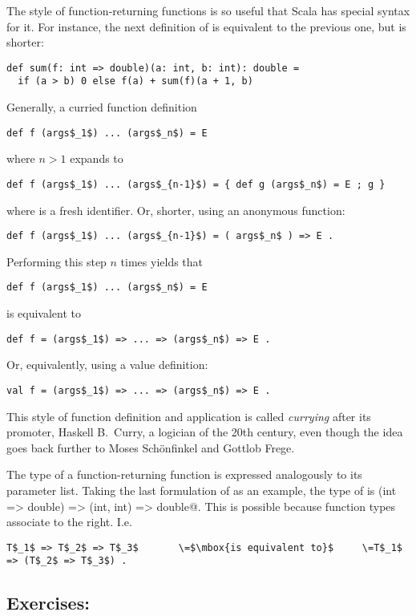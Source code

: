 \documentclass[11pt]{book}
\begin{document}
The style of function-returning functions is so useful that Scala has
special syntax for it. For instance, the next definition of \verb@sum@
is equivalent to the previous one, but is shorter:
\begin{verbatim}
def sum(f: int => double)(a: int, b: int): double =
  if (a > b) 0 else f(a) + sum(f)(a + 1, b)
\end{verbatim}
Generally, a curried function definition 
\begin{verbatim}
def f (args$_1$) ... (args$_n$) = E
\end{verbatim}
where $n > 1$ expands to
\begin{verbatim}
def f (args$_1$) ... (args$_{n-1}$) = { def g (args$_n$) = E ; g }
\end{verbatim}
where \verb@g@ is a fresh identifier. Or, shorter, using an anonymous function:
\begin{verbatim}
def f (args$_1$) ... (args$_{n-1}$) = ( args$_n$ ) => E .
\end{verbatim}
Performing this step $n$ times yields that
\begin{verbatim}
def f (args$_1$) ... (args$_n$) = E
\end{verbatim}
is equivalent to
\begin{verbatim}
def f = (args$_1$) => ... => (args$_n$) => E .
\end{verbatim}
Or, equivalently, using a value definition:
\begin{verbatim}
val f = (args$_1$) => ... => (args$_n$) => E .
\end{verbatim}
This style of function definition and application is called {\em
currying} after its promoter, Haskell B.\ Curry, a logician of the
20th century, even though the idea goes back further to Moses
Sch\"onfinkel and Gottlob Frege.

The type of a function-returning function is expressed analogously to
its parameter list. Taking the last formulation of \verb@sum@ as an example,
the type of \verb@sum@ is \verb@(int => double) => (int, int) => double@.
This is possible because function types associate to the right. I.e.
\begin{verbatim}
T$_1$ => T$_2$ => T$_3$       \=$\mbox{is equivalent to}$     \=T$_1$ => (T$_2$ => T$_3$) .
\end{verbatim}

\subsection*{Exercises:}
\end{document}
